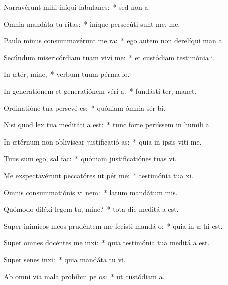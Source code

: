 \item Narravérunt mihi iníqui fabulanes:~* sed non   a.
\item Omnia mandáta tu ritas:~* iníque persecúti sunt me,  me.
\item Paulo minus consummavérunt me  ra:~* ego autem non derelíqui man a.
\item Secúndum misericórdiam tuam viví me:~* et custódiam testimónia  i.
\item In ætér, mine,~* verbum tuum pérma  lo.
\item In generatiónem et generatiónem véri a:~* fundásti ter,  manet.
\item Ordinatióne tua persevé es:~* quóniam ómnia sér bi.
\item Nisi quod lex tua meditáti a est:~* tunc forte periíssem in humili a.
\item In ætérnum non oblivíscar justificatió as:~* quia in ipsis viti me.
\item Tuus sum ego, sal  fac:~* quóniam justificatiónes tuas vi.
\item Me exspectavérunt peccatóres ut pér me:~* testimónia tua xi.
\item Omnis consummatiónis vi nem:~* latum mandátum  mis.
\item Quómodo diléxi legem tu, mine?~* tota die meditá a est.
\item Super inimícos meos prudéntem me fecísti mandá o:~* quia in æ hi est.
\item Super omnes docéntes me inxi:~* quia testimónia tua meditá a est.
\item Super senes inxi:~* quia mandáta tu vi.
\item Ab omni via mala prohíbui pe os:~* ut custódiam  a.
